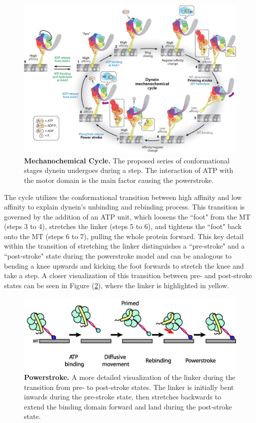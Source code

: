 \begin{figure}[H]
	\centering
	\includegraphics[width=1\columnwidth]{Figures/mechanochemical_cycle.jpeg}
	\caption[Mechanochemical Cycle]{\textbf{Mechanochemical Cycle.} The proposed series of conformational stages dynein undergoes during a step. The interaction of ATP with the motor domain is the main factor causing the powerstroke.  \cite{Cianfrocco2015mechanism}}
	\label{fig:MechanochemicalCycle}
\end{figure}

The cycle utilizes the conformational transition between high affinity and low affinity to explain dynein's unbinding and rebinding process. This transition is governed by the addition of an ATP unit, which loosens the ``foot" from the MT (steps 3 to 4), stretches the linker (steps 5 to 6), and tightens the ``foot" back onto the MT (steps 6 to 7), pulling the whole protein forward. This key detail within the transition of stretching the linker distinguishes a ``pre-stroke" and a ``post-stroke" state during the powerstroke model and can be analogous to bending a knee upwards and kicking the foot forwards to stretch the knee and take a step. A closer visualization of this transition between pre- and post-stroke states can be seen in Figure (\ref{fig:Powerstroke}), where the linker is highlighted in yellow.  

\begin{figure}[H]
	\centering
	\includegraphics[width=1\columnwidth]{Figures/powerstroke.jpeg}
	\caption[Powerstroke]{\textbf{Powerstroke.} A more detailed visualization of the linker during the transition from pre- to post-stroke states. The linker is initially bent inwards during the pre-stroke state, then stretches backwards to extend the binding domain forward and land during the post-stroke state. \cite{Carter2010communication} }
	\label{fig:Powerstroke}
\end{figure}


